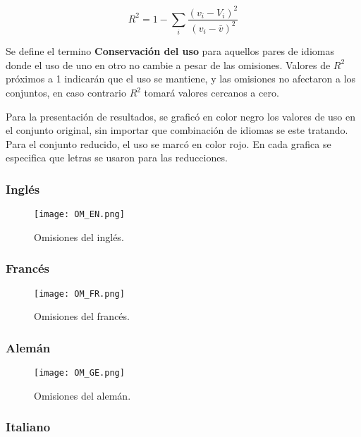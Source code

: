 \begin{equation}
\label{ec.dif_uso}
R^{2} = 1 - \sum_{i} \frac{ \left( v_{i} - V_{i} \right)^{2}  }{ \left( v_{i} - \bar{v} \right)^{2} }
\end{equation}


Se define el termino \textbf{Conservación del uso} para aquellos pares de idiomas donde el uso de uno en otro no cambie a pesar de las omisiones. Valores de $R^{2}$  próximos a 1 indicarán que el uso se mantiene, y las omisiones no afectaron a los conjuntos, en caso contrario $R^{2}$ tomará valores cercanos a cero.  

Para la presentación de resultados, se graficó en color negro los valores de uso en el conjunto original, sin importar que combinación de idiomas se este tratando.  Para el conjunto reducido, el uso se marcó en color rojo.  En cada grafica se especifica que letras se usaron para las reducciones. 

\newpage

\subsubsection*{Inglés}

\begin{figure}[h!]
	\centering
	\texttt{[image: OM\_EN.png]}
	\label{fig.OM_EN}
	\caption{Omisiones del inglés.}
\end{figure}


\subsubsection*{Francés}

\begin{figure}[h!]
	\centering
	\texttt{[image: OM\_FR.png]}
	\label{fig.OM_FR}
	\caption{Omisiones del francés.}
\end{figure}


\newpage
\subsubsection*{Alemán}

\begin{figure}[h!]
	\centering
	\texttt{[image: OM\_GE.png]}
	\label{fig.OM_GE}
	\caption{Omisiones del alemán.}
\end{figure}


\subsubsection*{Italiano}

